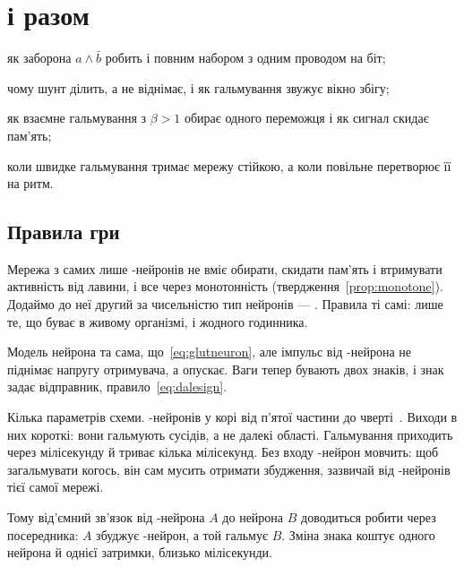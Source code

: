 \chapter{ і  разом}
\label{sec:gaba}
\begin{chaptergoals}
\item як заборона $a\wedge\bar b$ робить  і  повним набором з одним проводом на біт;
\item чому шунт ділить, а не віднімає, і як гальмування звужує вікно збігу;
\item як взаємне гальмування з $\beta>1$ обирає одного переможця і як сигнал скидає пам'ять;
\item коли швидке гальмування тримає мережу стійкою, а коли повільне перетворює її на ритм.
\end{chaptergoals}

\section{Правила гри}

Мережа з самих лише -нейронів не вміє обирати, скидати пам'ять і втримувати активність від лавини, і все через монотонність (твердження~\ref{prop:monotone}). Додаймо до неї другий за чисельністю тип нейронів --- . Правила ті самі: лише те, що буває в живому організмі, і жодного годинника.

Модель нейрона та сама, що~\eqref{eq:glutneuron}, але імпульс від -нейрона не піднімає напругу отримувача, а опускає. Ваги тепер бувають двох знаків, і знак задає відправник, правило~\eqref{eq:dalesign}.

Кілька параметрів схеми. -нейронів у корі від п'ятої частини до чверті~\cite{Hendry1987}. Виходи в них короткі: вони гальмують сусідів, а не далекі області. Гальмування приходить через мілісекунду й триває кілька мілісекунд. Без входу -нейрон мовчить: щоб загальмувати когось, він сам мусить отримати збудження, зазвичай від -нейронів тієї самої мережі.

Тому від'ємний зв'язок від -нейрона $A$ до нейрона $B$ доводиться робити через посередника: $A$ збуджує -нейрон, а той гальмує $B$. Зміна знака коштує одного нейрона й однієї затримки, близько мілісекунди.

